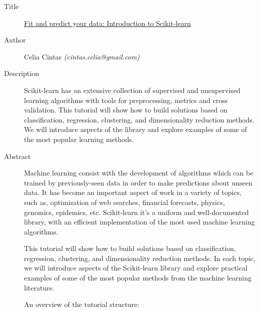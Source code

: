 \begin{description}
   \item[Title] \underline{Fit and predict your data: Introduction to Scikit-learn}
   \item[Author] Celia Cintas \emph{(cintas.celia@gmail.com)}
   \item[Description] Scikit-learn has an extensive collection of supervised and unsupervised learning algorithms with tools for preprocessing, metrics and cross validation. This tutorial will show how to build solutions based on classification, regression, clustering, and dimensionality reduction methods. We will introduce aspects of the library and explore examples of some of the most popular learning methods. 
   \item[Abstract] Machine learning consist with the development of algorithms which can be trained by previously-seen data in order to make predictions about unseen data. It has become an important aspect of work in a variety of topics, such as, optimization of web searches, financial forecasts, physics, genomics, epidemics, etc. Scikit-learn it's a uniform and well-documented library, with an efficient implementation of the most used machine learning algorithms.

This tutorial will show how to build solutions based on classification, regression, clustering, and dimensionality reduction methods. In each topic, we will introduce aspects of the Scikit-learn library and explore practical examples of some of the most popular methods from the machine learning literature.

An overview of the tutorial structure:


\end{description}
